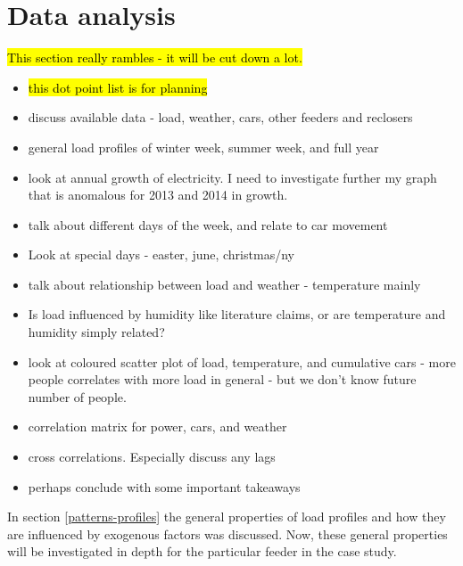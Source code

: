 \section{Data analysis}
\label{bruny-data-analysis}
\hl{This section really rambles - it will be cut down a lot.}
\begin{itemize}
	\item \hl{this dot point list is for planning}
	\item discuss available data - load, weather, cars, other feeders and reclosers
	\item general load profiles of winter week, summer week, and full year
	\item look at annual growth of electricity. I need to investigate further my graph that is anomalous for 2013 and 2014 in growth.
	\item talk about different days of the week, and relate to car movement
	\item Look at special days - easter, june, christmas/ny
	\item talk about relationship between load and weather - temperature mainly
	\item Is load influenced by humidity like literature claims, or are temperature and humidity simply related?
	\item look at coloured scatter plot of load, temperature, and cumulative cars - more people correlates with more load in general - but we don't know future number of people.
	\item correlation matrix for power, cars, and weather
	\item cross correlations. Especially discuss any lags
	\item perhaps conclude with some important takeaways
	
\end{itemize}

In section \ref{patterns-profiles} the general properties of load profiles and how they are influenced by exogenous factors was discussed. Now, these general properties will be investigated in depth for the particular feeder in the case study.
